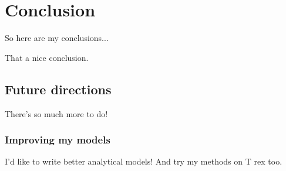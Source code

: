 \chapter{Conclusion}
\label{chap:conclusions}

So here are my conclusions...

That a nice conclusion.

\section{Future directions}
\label{sec:future-directions}

There's so much more to do!

\subsection{Improving my models}
\label{sec:bett-spec-models}

I'd like to write better analytical models! And try my methods on T rex too.
